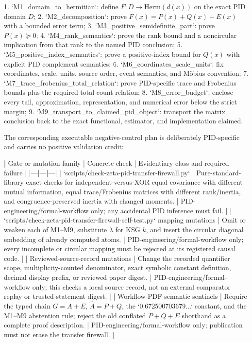 \documentclass[11pt]{article}
\begin{document}
\begin{markdown}
1. `M1_domain_to_hermitian`: define $F:D\to\mathrm{Herm}(d(x))$ on the exact PID domain
   $D$;
2. `M2_decomposition`: prove $F(x)=P(x)+Q(x)+E(x)$ with a bounded error term;
3. `M3_positive_semidefinite_part`: prove $P(x)\succeq0$;
4. `M4_rank_semantics`: prove the rank bound and a noncircular implication from that rank to the
   named PID conclusion;
5. `M5_positive_index_semantics`: prove a positive-index bound for $Q(x)$ with explicit PID
   complement semantics;
6. `M6_coordinates_scale_units`: fix coordinates, scale, units, source order, event semantics, and
   Möbius convention;
7. `M7_trace_frobenius_total_relation`: prove PID-specific trace and Frobenius bounds plus the
   required total-count relation;
8. `M8_error_budget`: enclose every tail, approximation, representation, and numerical error below
   the strict margin;
9. `M9_transport_to_claimed_pid_object`: transport the matrix conclusion back to the exact
   functional, estimator, and implementation claimed.

The corresponding executable negative-control plan is deliberately PID-specific and carries no
positive validation credit:

| Gate or mutation family | Concrete check | Evidentiary class and required failure |
|---|---|---|
| `scripts/check-zeta-pid-transfer-firewall.py` | Pure-standard-library exact checks for independent-versus-XOR equal covariance with different mutual information, equal trace/Frobenius matrices with different rank/inertia, and congruence-preserved inertia with changed moments. | PID-engineering/formal-workflow only; any accidental PID inference must fail. |
| `scripts/check-zeta-pid-transfer-firewall-self-test.py` mapping mutations | Omit or weaken each of M1--M9, substitute $\lambda$ for KSG $k$, and insert the circular diagonal embedding of already computed atoms. | PID-engineering/formal-workflow only; every incomplete or circular mapping must be rejected at its registered causal code. |
| Reviewed-source-record mutations | Change the recorded quantifier scope, multiplicity-counted denominator, exact symbolic constant definition, decimal display prefix, or reviewed paper digest. | PID-engineering/formal-workflow only; this checks a local source record, not an external comparator replay or trusted-statement digest. |
| Workflow-PDF semantic sentinels | Require the typed chain $G=A+E$, $\widehat A=P+Q$, the `0.672500703679...` constant, and the M1--M9 abstention rule; reject the old conflated $P+Q+E$ shorthand as a complete proof description. | PID-engineering/formal-workflow only; publication must not erase the transfer firewall. |


\end{markdown}
\end{document}
